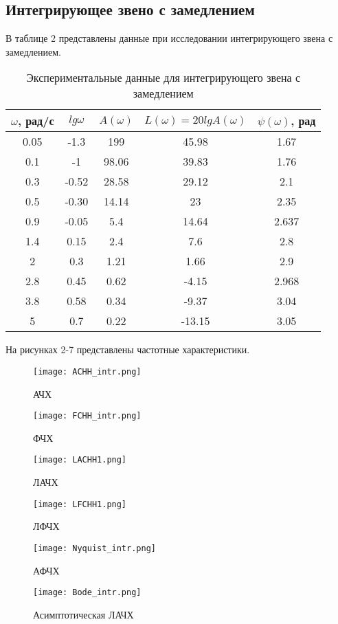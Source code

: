 \documentclass[12pt,a4paper]{article}
\begin{document}
\newpage
\begin{center}
\section{Интегрирующее звено с замедлением}
\end{center}

В таблице 2 представлены данные при исследовании интегрирующего звена с замедлением.
\begin{table}[h!]
	\renewcommand{\arraystretch}{1.8} %
	\centering
	\begin{threeparttable}
	\caption{Экспериментальные данные для интегрирующего звена с замедлением}
	\begin{tabular}{|c|c|c|c|c|}
		\hline $\omega$, рад/с & $lg\omega$ & $A(\omega)$ & $L(\omega)=20lgA(\omega)$ & $\psi(\omega)$, рад\\
		\hline 0.05 & -1.3 & 199 & 45.98 & 1.67\\
		\hline 0.1 & -1 & 98.06 & 39.83 & 1.76\\
		\hline 0.3 & -0.52 & 28.58 & 29.12 & 2.1\\
		\hline 0.5 & -0.30 & 14.14 & 23 & 2.35\\
		\hline 0.9 & -0.05 & 5.4 & 14.64 & 2.637\\
		\hline 1.4 & 0.15 & 2.4 & 7.6 & 2.8\\
		\hline 2 & 0.3 & 1.21 & 1.66 & 2.9\\
		\hline 2.8 & 0.45 & 0.62 & -4.15 & 2.968\\
		\hline 3.8 & 0.58 & 0.34 & -9.37 & 3.04\\
		\hline 5 & 0.7 & 0.22 & -13.15 & 3.05\\
		\hline
	\end{tabular}
	\end{threeparttable}
\end{table}

На рисунках 2-7 представлены частотные характеристики.
\begin{figure}[H]
	\centering
	\texttt{[image: ACHH\_intr.png]}
	\caption{АЧХ}
\end{figure}
\begin{figure}[H]
	\centering
	\texttt{[image: FCHH\_intr.png]}
	\caption{ФЧХ}
\end{figure}
\begin{figure}[H]
	\centering
	\texttt{[image: LACHH1.png]}
	\caption{ЛАЧХ}
\end{figure}
\begin{figure}[H]
	\centering
	\texttt{[image: LFCHH1.png]}
	\caption{ЛФЧХ}
\end{figure}
\begin{figure}[H]
	\centering
	\texttt{[image: Nyquist\_intr.png]}
	\caption{АФЧХ}
\end{figure}
\begin{figure}[H]
	\centering
	\texttt{[image: Bode\_intr.png]}
	\caption{Асимптотическая ЛАЧХ}
\end{figure}
\end{document}
